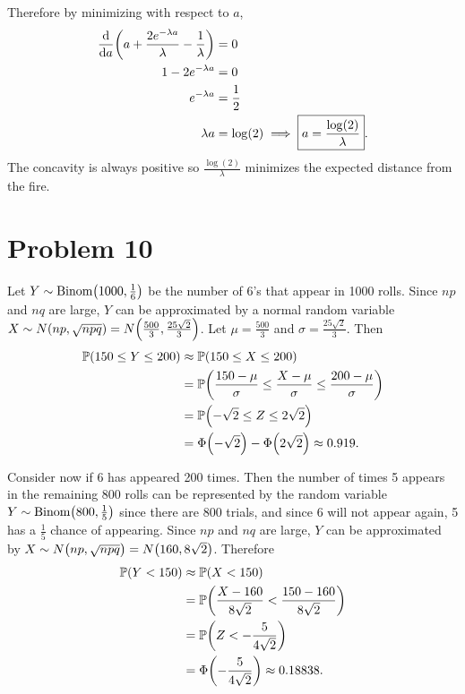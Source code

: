 \documentclass[12pt]{extarticle}
\begin{document}
Therefore by minimizing with respect to $a$,
\begin{align*}
	\dv{a} \qty(a + \frac{2e^{-\lambda a}}{\lambda} - \frac{1}{\lambda}) &= 0 \\
	1 - 2e^{-\lambda a} &= 0 \\
	e^{-\lambda a} &= \frac{1}{2} \\
	\lambda a &= \log(2) \implies \boxed{a = \frac{\log(2)}{\lambda}}
.\end{align*}
The concavity is always positive so $\frac{\log(2)}{\lambda}$ minimizes the expected distance from the fire.

\section*{Problem 10}
Let $Y \sim \text{Binom}\qty(1000, \frac{1}{6})$ be the number of $6$'s that appear in 1000 rolls. Since $np$ and $nq$ are large, $Y$ can be approximated by a normal random variable $X \sim N(np, \sqrt{npq}) = N\qty(\frac{500}{3}, \frac{25\sqrt{2}}{3})$. Let $\mu = \frac{500}{3}$ and $\sigma = \frac{25\sqrt{2}}{3}$. Then
\begin{align*}
	\mathbb{P}\qty(150 \leq Y \leq 200) &\approx \mathbb{P}\qty(150 \leq X \leq 200) \\
							   &= \mathbb{P}\qty(\frac{150 - \mu}{\sigma} \leq \frac{X - \mu}{\sigma} \leq \frac{200 - \mu}{\sigma}) \\
							   &= \mathbb{P}\qty(-\sqrt{2} \leq Z \leq 2\sqrt{2}) \\
							   &= \Phi\qty(-\sqrt{2}) - \Phi\qty(2\sqrt{2}) \approx 0.919
.\end{align*}

Consider now if 6 has appeared 200 times. Then the number of times 5 appears in the remaining 800 rolls can be represented by the random variable $Y \sim \text{Binom}\qty(800, \frac{1}{5})$ since there are 800 trials, and since 6 will not appear again, 5 has a $\frac{1}{5}$ chance of appearing. Since $np$ and $nq$ are large, $Y$ can be approximated by $X \sim N\qty(np, \sqrt{npq}) = N\qty(160, 8\sqrt{2})$. Therefore
\begin{align*}
	\mathbb{P}\qty(Y < 150) &\approx \mathbb{P}\qty(X < 150) \\
				   &= \mathbb{P}\qty(\frac{X - 160}{8\sqrt{2}} < \frac{150 - 160}{8\sqrt{2}}) \\
				   &= \mathbb{P}\qty(Z < -\frac{5}{4 \sqrt{2}}) \\
				   &= \Phi\qty(-\frac{5}{4 \sqrt{2}}) \approx 0.18838
.\end{align*}
\end{document}
